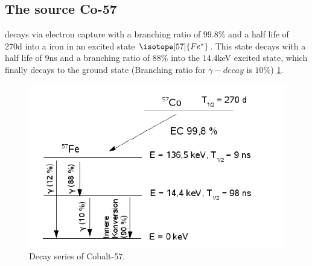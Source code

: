 \subsection{The source Co-57}
 decays via electron capture with a branching ratio of $99.8 \%$ and a half life of 270d into a iron in an excited state $\isotope[57]{Fe^*}$. This state decays with a half life of 9ns and a branching ratio of $88\%$ into the $14.4$keV excited state, which finally decays to the ground state (Branching ratio for $\gamma-decay$ is $10\%$) \ref{fig:principles:Zerfallsschema2}.
\begin{figure}[hbt]
	\centering
	\includegraphics[width=0.5\linewidth]{graphics/Zerfallsschema2}
	\caption[Co-57 decay]{Decay series of Cobalt-57. \cite{khwz}}
	\label{fig:principles:Zerfallsschema2}
\end{figure}
